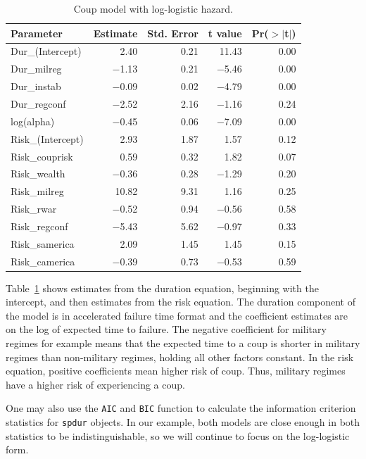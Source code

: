 \documentclass[12pt,onesided]{amsart}
\begin{document}
\begin{table}[ht]
\centering
\begin{tabular}{lrrrr}
  \hline
Parameter & Estimate & Std. Error & t value & Pr($>$$|$t$|$) \\ 
  \hline
Dur\_(Intercept) & 2.40 & 0.21 & 11.43 & 0.00 \\ 
  Dur\_milreg & $-$1.13 & 0.21 & $-$5.46 & 0.00 \\ 
  Dur\_instab & $-$0.09 & 0.02 & $-$4.79 & 0.00 \\ 
  Dur\_regconf & $-$2.52 & 2.16 & $-$1.16 & 0.24 \\ 
  log(alpha) & $-$0.45 & 0.06 & $-$7.09 & 0.00 \\ 
  Risk\_(Intercept) & 2.93 & 1.87 & 1.57 & 0.12 \\ 
  Risk\_couprisk & 0.59 & 0.32 & 1.82 & 0.07 \\ 
  Risk\_wealth & $-$0.36 & 0.28 & $-$1.29 & 0.20 \\ 
  Risk\_milreg & 10.82 & 9.31 & 1.16 & 0.25 \\ 
  Risk\_rwar & $-$0.52 & 0.94 & $-$0.56 & 0.58 \\ 
  Risk\_regconf & $-$5.43 & 5.62 & $-$0.97 & 0.33 \\ 
  Risk\_samerica & 2.09 & 1.45 & 1.45 & 0.15 \\ 
  Risk\_camerica & $-$0.39 & 0.73 & $-$0.53 & 0.59 \\ 
   \hline
\end{tabular}
\caption{Coup model with log-logistic hazard.} 
\label{loglog_table}
\end{table}

Table~\ref{loglog_table} shows estimates from the duration equation,
beginning with the intercept, and then estimates from the risk equation.
The duration component of the model is in accelerated failure time
format and the coefficient estimates are on the log of expected time to
failure. The negative coefficient for military regimes for example means
that the expected time to a coup is shorter in military regimes than
non-military regimes, holding all other factors constant. In the risk
equation, positive coefficients mean higher risk of coup. Thus, military
regimes have a higher risk of experiencing a coup.

One may also use the \texttt{AIC} and \texttt{BIC} function to calculate the
information criterion statistics for \texttt{spdur} objects. In our
example, both models are close enough in both statistics to be
indistinguishable, so we will continue to focus on the log-logistic
form.
\end{document}
